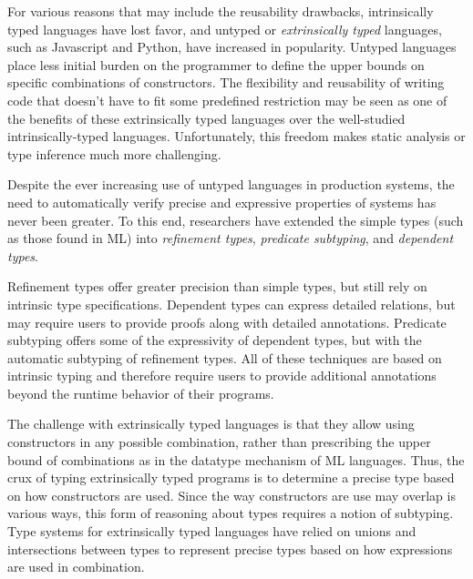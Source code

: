 \documentclass[acmsmall]{acmart}
\theoremstyle{definition}
\begin{document}
For various reasons that may include the reusability drawbacks, intrinsically typed languages have lost favor,
and untyped or \textit{extrinsically typed} languages, 
such as Javascript and Python, have increased in popularity. 
Untyped languages place less initial burden on the programmer to define the upper bounds
on specific combinations of constructors.
The flexibility and reusability of writing code that doesn't have to fit some predefined restriction 
may be seen as one of the benefits of these extrinsically typed languages over the well-studied intrinsically-typed languages.
Unfortunately, this freedom makes static analysis or type inference much more challenging. 

Despite the ever increasing use of untyped languages in production systems, 
the need to automatically verify precise and expressive properties of systems has never been greater.
To this end, researchers have extended the simple types (such as those found in ML) into 
\textit{refinement types}, \textit{predicate subtyping}, and \textit{dependent types}. 

Refinement types offer greater precision than simple types, but still rely on intrinsic type specifications.
Dependent types can express detailed relations, but may require users to provide proofs along with detailed annotations.
Predicate subtyping offers some of the expressivity of dependent types, but with the automatic subtyping of refinement types.
All of these techniques are based on intrinsic typing and therefore require users to provide additional annotations
beyond the runtime behavior of their programs.

The challenge with extrinsically typed languages is that they allow using constructors
in any possible combination, rather than prescribing the upper bound of combinations as in
the datatype mechanism of ML languages. Thus, the crux of typing extrinsically typed programs is
to determine a precise type based on how constructors are used. 
Since the way constructors are use may overlap is various ways, this form of reasoning about types
requires a notion of subtyping.
Type systems for extrinsically typed languages have relied on unions and intersections between types to 
represent precise types based on how expressions are used in combination. 
\end{document}
